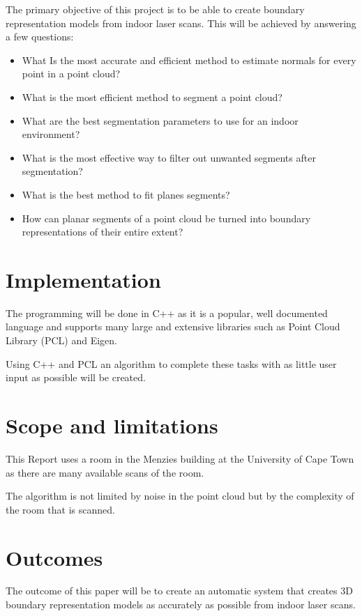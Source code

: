 		The primary objective of this project is to be able to create boundary representation models from indoor laser scans. This will be achieved by answering a few questions:
		
		\begin{itemize}
			\item What Is the most accurate and efficient method to estimate normals for every point in a point cloud?
			
			\item What is the most efficient method to segment a point cloud?
			
			\item What are the best segmentation parameters to use for an indoor environment?
			
			\item What is the most effective way to filter out unwanted segments after segmentation?
			
			\item What is the best method to fit planes segments?
			
			\item How can planar segments of a point cloud be turned into boundary representations of their entire extent?
			
		\end{itemize}
	
	\section{Implementation}
	
		The programming will be done in C++ as it is a popular, well documented language and supports many large and extensive libraries such as Point Cloud Library (PCL) and Eigen. 
		
		Using C++ and PCL an algorithm to complete these tasks with as little user input as possible will be created.
	
	\section{Scope and limitations}
		This Report uses a room in the Menzies building at the University of Cape Town as there are many available scans of the room.
		
		The algorithm is not limited by noise in the point cloud but by the complexity of the room that is scanned. 
	
	
	\section{Outcomes}
	
		The outcome of this paper will be to create an automatic system that creates 3D boundary representation models as accurately as possible from indoor laser scans.
	
	
	
	



